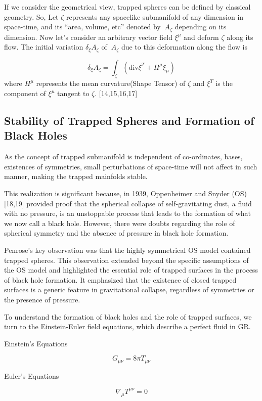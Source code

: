 \documentclass{article}
\begin{document}
If we consider the geometrical view, trapped spheres can be defined by classical geometry.
So, Let $\zeta$ represents any spacelike submanifold of any dimension in space-time, and its “area, volume, etc” denoted by $\ A_\zeta $ depending on its dimension. Now let's consider an arbitrary vector field $\xi^{\mu}$ and deform $\zeta$ along its flow. The initial variation 
$\delta_{\xi} A_{\zeta}$ of $\ A_\zeta $ due to this deformation along the flow is

$$\delta_{\xi} A_{\zeta}= \int_{\zeta} (\text{div}\xi^T + H^{\mu}\xi_{\mu})
$$
where $H^{\mu}$ represents the mean curvature(Shape Tensor)  of $\zeta$ and $\xi^T$ is the component of $\xi^\mu$ tangent to $\zeta$. [14,15,16,17]


\subsection{\large Stability of Trapped Spheres and Formation of Black Holes}
\large 
As the concept of trapped submanifold is independent of co-ordinates, bases, existences of symmetries, small perturbations of space-time will not affect in such manner, making the trapped mainfolds stable.


This realization is significant because, in 1939, Oppenheimer and Snyder (OS) [18,19] provided proof that the spherical collapse of self-gravitating dust, a fluid with no pressure, is an unstoppable process that leads to the formation of what we now call a black hole. However, there were doubts regarding the role of spherical symmetry and the absence of pressure in black hole formation.

Penrose's key observation was that the highly symmetrical OS model contained trapped spheres. This observation extended beyond the specific assumptions of the OS model and highlighted the essential role of trapped surfaces in the process of black hole formation. It emphasized that the existence of closed trapped surfaces is a generic feature in gravitational collapse, regardless of symmetries or the presence of pressure.

To understand the formation of black holes and the role of trapped surfaces, we turn to the Einstein-Euler field equations, which describe a perfect fluid in GR. 

\Large Einstein's Equations

\large
$$G_{\mu\nu} = 8\pi T_{\mu\nu}
 $$  

\Large Euler's Equations

\large 
$$ \nabla_{\mu} T^{\mu\nu} = 0 $$
\end{document}

